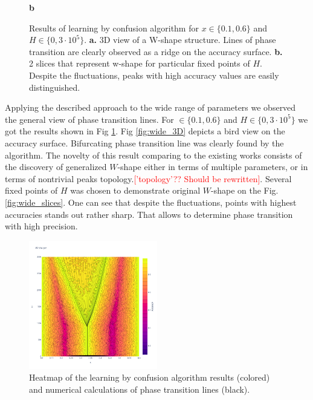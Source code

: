 \begin{figure}[h]
\begin{minipage}{0.45\textwidth}
        \caption*{\textbf{b}}
        \label{fig:wide_slices}
    \end{minipage}
    \caption{Results of learning by confusion algorithm for $x \in \{0.1, 0.6\}$ and $H \in \{0, 3 \cdot 10^5\}$. \textbf{a.} 3D view of a W-shape structure. Lines of phase transition are clearly observed as a ridge on the accuracy surface. \textbf{b.} 2 slices that represent w-shape for particular fixed points of $H$. Despite the fluctuations, peaks with high accuracy values are easily distinguished.}
    \label{fig:wide}
\end{figure}

Applying the described approach to the wide range of parameters we observed the general view of phase transition lines.
For $ \in \{0.1, 0.6\}$ and $H \in \{0, 3 \cdot 10^5\}$ we got the results shown in Fig \ref{fig:wide}.
Fig \ref{fig:wide_3D} depicts a bird view on the accuracy surface.
Bifurcating phase transition line was clearly found by the algorithm.
The novelty of this result comparing to the existing works consists of the discovery of generalized $W$-shape either in terms of multiple parameters, or in terms of nontrivial peaks topology.\textcolor{red}{['topology'?? Should be rewritten]}.
Several fixed points of $H$ was chosen to demonstrate original $W$-shape on the Fig. \ref{fig:wide_slices}.
One can see that despite the fluctuations, points with highest accuracies stands out rather sharp.
That allows to determine phase transition with high precision.

\begin{figure}
    \centering
    \includegraphics[width=0.5\textwidth]{../fig/wide_2D.png}
    \caption{Heatmap of the learning by confusion algorithm results (colored) and numerical calculations of phase transition lines (black).}
    \label{fig:wide_2D}
\end{figure}

